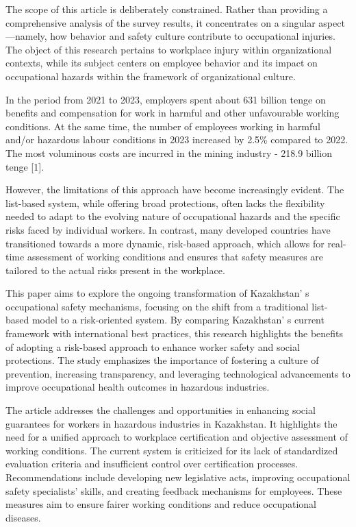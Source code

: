 \begin{multicols}{2}
The scope of this article is deliberately constrained. Rather than
providing a comprehensive analysis of the survey results, it
concentrates on a singular aspect---namely, how behavior and safety
culture contribute to occupational injuries. The object of this research
pertains to workplace injury within organizational contexts, while its
subject centers on employee behavior and its impact on occupational
hazards within the framework of organizational culture.

In the period from 2021 to 2023, employers spent about 631 billion tenge
on benefits and compensation for work in harmful and other unfavourable
working conditions. At the same time, the number of employees working in
harmful and/or hazardous labour conditions in 2023 increased by 2.5\%
compared to 2022. The most voluminous costs are incurred in the mining
industry - 218.9 billion tenge {[}1{]}.

However, the limitations of this approach have become increasingly
evident. The list-based system, while offering broad protections, often
lacks the flexibility needed to adapt to the evolving nature of
occupational hazards and the specific risks faced by individual workers.
In contrast, many developed countries have transitioned towards a more
dynamic, risk-based approach, which allows for real-time assessment of
working conditions and ensures that safety measures are tailored to the
actual risks present in the workplace.

This paper aims to explore the ongoing transformation of
Kazakhstan' s occupational safety mechanisms, focusing on
the shift from a traditional list-based model to a risk-oriented system.
By comparing Kazakhstan' s current framework with
international best practices, this research highlights the benefits of
adopting a risk-based approach to enhance worker safety and social
protections. The study emphasizes the importance of fostering a culture
of prevention, increasing transparency, and leveraging technological
advancements to improve occupational health outcomes in hazardous
industries.

The article addresses the challenges and opportunities in enhancing
social guarantees for workers in hazardous industries in Kazakhstan. It
highlights the need for a unified approach to workplace certification
and objective assessment of working conditions. The current system is
criticized for its lack of standardized evaluation criteria and
insufficient control over certification processes. Recommendations
include developing new legislative acts, improving occupational safety
specialists'{} skills, and creating feedback mechanisms
for employees. These measures aim to ensure fairer working conditions
and reduce occupational diseases.


\end{multicols}
